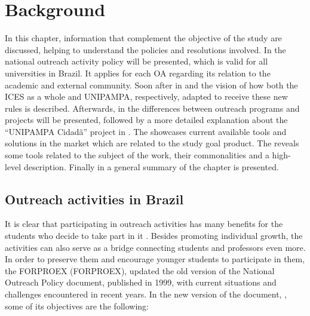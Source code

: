 \chapter{Background}\label{background}

In this chapter, information that complement the objective of the study are discussed, helping to understand the policies and resolutions involved. In  the national outreach activity policy will be presented, which is valid for all universities in Brazil. It applies for each \ac{OA} regarding its relation to the academic and external community. Soon after in  and  the vision of how both the \ac{ICES} as a whole and \acl{UNIPAMPA}, respectively, adapted to receive these new rules is described. Afterwards, in  the differences between outreach programs and projects will be presented, followed by a more detailed explanation about the ``\ac{UNIPAMPA} Cidadã'' project in . The  showcases current available tools and solutions in the market which are related to the study goal product. The  reveals some tools related to the subject of the work, their commonalities and a high-level description. Finally in  a general summary of the chapter is presented.

\section{Outreach activities in Brazil}\label{sec:bac-1}

It is clear that participating in outreach activities has many benefits for the students who decide to take part in it \cite{sellou2011many}. Besides promoting individual growth, the activities can also serve as a bridge connecting students and professors even more. In order to preserve them and encourage younger students to participate in them, the \acl{FORPROEX} (\ac{FORPROEX}), updated the old version of the National Outreach Policy document, published in 1999, with current situations and challenges encountered in recent years. In the new version of the document, \cite{politicaNacional}, some of its objectives are the following:

